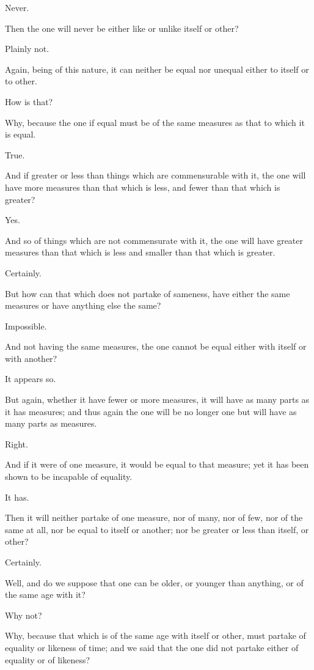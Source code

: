 Never.

Then the one will never be either like or unlike itself or other?

Plainly not.

Again, being of this nature, it can neither be equal nor unequal either
to itself or to other.

How is that?

Why, because the one if equal must be of the same measures as that to
which it is equal.

True.

And if greater or less than things which are commensurable with it, the
one will have more measures than that which is less, and fewer than that
which is greater?

Yes.

And so of things which are not commensurate with it, the one will have
greater measures than that which is less and smaller than that which is
greater.

Certainly.

But how can that which does not partake of sameness, have either the
same measures or have anything else the same?

Impossible.

And not having the same measures, the one cannot be equal either with
itself or with another?

It appears so.

But again, whether it have fewer or more measures, it will have as many
parts as it has measures; and thus again the one will be no longer one
but will have as many parts as measures.

Right.

And if it were of one measure, it would be equal to that measure; yet it
has been shown to be incapable of equality.

It has.

Then it will neither partake of one measure, nor of many, nor of few,
nor of the same at all, nor be equal to itself or another; nor be
greater or less than itself, or other?

Certainly.

Well, and do we suppose that one can be older, or younger than anything,
or of the same age with it?

Why not?

Why, because that which is of the same age with itself or other, must
partake of equality or likeness of time; and we said that the one did
not partake either of equality or of likeness?

